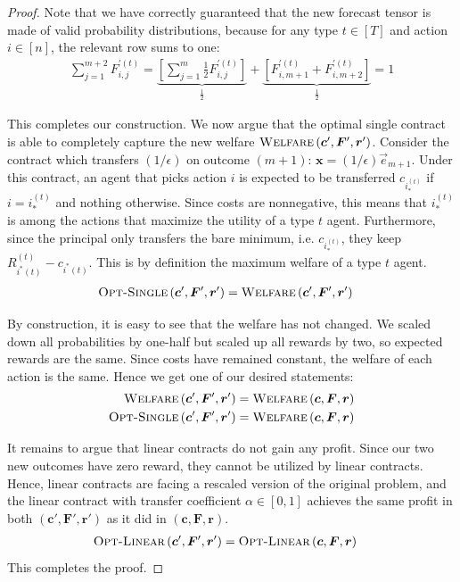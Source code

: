 \documentclass{article}
\newcommand{\cost}[1]{c_{#1}}
\newcommand{\costvector}{\bm{c}}
\newcommand{\ForecastTensor}{\bm{F}}
\newcommand{\rewardvector}{\bm{r}}
\newcommand{\TypedExpectedReward}[2]{R^{(#1)}_{#2}}
\newcommand{\PrincipalAgentProblem}{\left(\costvector, \ForecastTensor, \rewardvector\right)}
\newcommand{\PrincipalAgentProblemPrime}{\left(\costvector', \ForecastTensor', \rewardvector'\right)}
\newcommand{\ContractVector}{\bm{x}}
\newcommand{\TransferCoefficient}{\alpha}
\newcommand{\OptimalAction}{i_*}
\newcommand{\TypedOptimalAction}[1]{\OptimalAction^{(#1)}}
\newcommand{\forecastprime}[3]{F^{\prime(#1)}_{#2, #3}}
\newcommand{\OWelfare}{\textsc{Welfare}}
\newcommand{\OSingle}{\textsc{Opt-Single}}
\newcommand{\OLinear}{\textsc{Opt-Linear}}
\newcommand{\StandardBasisVector}[1]{\vec{e}_{#1}}
\begin{document}
\begin{proof}
  Note that we have correctly guaranteed that the new forecast tensor is made of valid probability distributions, because for any type $t \in [T]$ and action $i \in [n]$, the relevant row sums to one:
  \begin{align*}
    \sum_{j=1}^{m+2} \forecastprime{t}{i}{j}
      = \underbrace{\left[ \sum_{j=1}^m \frac{1}{2} \forecastprime{t}{i}{j} \right]}_{\tfrac12}
      + \underbrace{\left[ \forecastprime{t}{i}{m+1} + \forecastprime{t}{i}{m+2} \right]}_{\frac12}
      = 1
  \end{align*}
  
  This completes our construction. We now argue that the optimal single contract is able to completely capture the new welfare $\OWelfare \PrincipalAgentProblemPrime$. Consider the contract which transfers $\left(1 / \epsilon\right)$ on outcome $(m+1)$: $\ContractVector = \left( 1 / \epsilon \right) \StandardBasisVector{m+1}$. Under this contract, an agent that picks action $i$ is expected to be transferred $\cost{\TypedOptimalAction{t}}$ if $i = \TypedOptimalAction{t}$ and nothing otherwise. Since costs are nonnegative, this means that $\TypedOptimalAction{t}$ is among the actions that maximize the utility of a type $t$ agent. Furthermore, since the principal only transfers the bare minimum, i.e. $\cost{\TypedOptimalAction{t}}$, they keep $\TypedExpectedReward{t}{i^*(t)} - \cost{i^*(t)}$. This is by definition the maximum welfare of a type $t$ agent.
  \begin{align*}
    \OSingle \PrincipalAgentProblemPrime &= \OWelfare \PrincipalAgentProblemPrime
  \end{align*}
  
  By construction, it is easy to see that the welfare has not changed. We scaled down all probabilities by one-half but scaled up all rewards by two, so expected rewards are the same. Since costs have remained constant, the welfare of each action is the same. Hence we get one of our desired statements:
  \begin{align*}
    \OWelfare \PrincipalAgentProblemPrime &= \OWelfare \PrincipalAgentProblem \\
    \OSingle \PrincipalAgentProblemPrime &= \OWelfare \PrincipalAgentProblem
  \end{align*}

  It remains to argue that linear contracts do not gain any profit. Since our two new outcomes have zero reward, they cannot be utilized by linear contracts. Hence, linear contracts are facing a rescaled version of the original problem, and the linear contract with transfer coefficient $\TransferCoefficient \in [0, 1]$ achieves the same profit in both $\PrincipalAgentProblemPrime$ as it did in $\PrincipalAgentProblem$.
  \begin{align*}
    \OLinear \PrincipalAgentProblemPrime &= \OLinear \PrincipalAgentProblem
  \end{align*}
  This completes the proof.
\end{proof}
\end{document}
